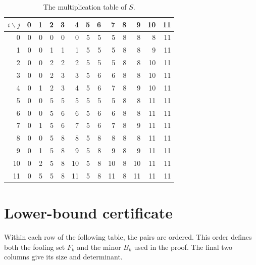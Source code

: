\documentclass[11pt,a4paper]{article}
\theoremstyle{definition}
\begin{document}
\begin{table}[ht]
\centering
\small
\setlength{\tabcolsep}{5.1pt}
\renewcommand{\arraystretch}{1.22}
\begin{tabular}{r|rrrrrrrrrrrr}
\toprule
$i\backslash j$ & 0&1&2&3&4&5&6&7&8&9&10&11\\
\midrule
0 & 0 & 0 & 0 & 0 & 0 & 5 & 5 & 5 & 8 & 8 & 8 & 11 \\
1 & 0 & 0 & 1 & 1 & 1 & 5 & 5 & 5 & 8 & 8 & 9 & 11 \\
2 & 0 & 0 & 2 & 2 & 2 & 5 & 5 & 5 & 8 & 8 & 10 & 11 \\
3 & 0 & 0 & 2 & 3 & 3 & 5 & 6 & 6 & 8 & 8 & 10 & 11 \\
4 & 0 & 1 & 2 & 3 & 4 & 5 & 6 & 7 & 8 & 9 & 10 & 11 \\
5 & 0 & 0 & 5 & 5 & 5 & 5 & 5 & 5 & 8 & 8 & 11 & 11 \\
6 & 0 & 0 & 5 & 6 & 6 & 5 & 6 & 6 & 8 & 8 & 11 & 11 \\
7 & 0 & 1 & 5 & 6 & 7 & 5 & 6 & 7 & 8 & 9 & 11 & 11 \\
8 & 0 & 0 & 5 & 8 & 8 & 5 & 8 & 8 & 8 & 8 & 11 & 11 \\
9 & 0 & 1 & 5 & 8 & 9 & 5 & 8 & 9 & 8 & 9 & 11 & 11 \\
10 & 0 & 2 & 5 & 8 & 10 & 5 & 8 & 10 & 8 & 10 & 11 & 11 \\
11 & 0 & 5 & 5 & 8 & 11 & 5 & 8 & 11 & 8 & 11 & 11 & 11 \\
\bottomrule
\end{tabular}
\caption{The multiplication table of $S$.}\label{tab:multiplication}
\end{table}

\section{Lower-bound certificate}\label{app:lower}

Within each row of the following table, the pairs are ordered. This
order defines both the fooling set $F_k$ and the minor $B_k$ used in the
proof. The final two columns give its size and determinant.
\end{document}
